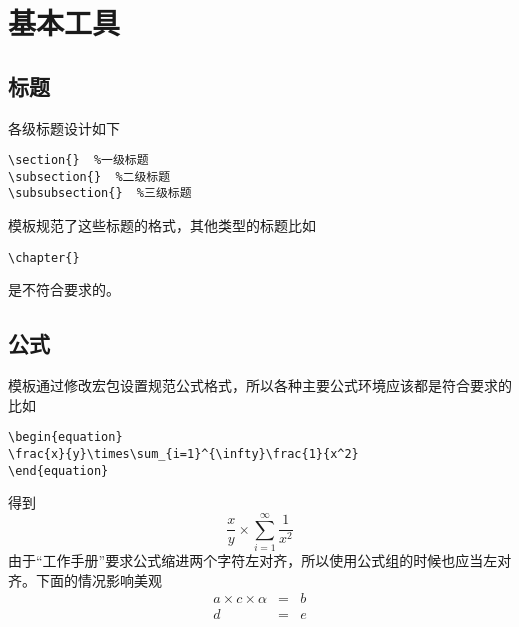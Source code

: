 \section{基本工具}
\label{ch2}
\subsection{标题}
\label{ch2_1}
各级标题设计如下
\begin{lstlisting}[frame=single]
\section{}  %一级标题
\subsection{}  %二级标题
\subsubsection{}  %三级标题
\end{lstlisting}
模板规范了这些标题的格式，其他类型的标题比如
\begin{lstlisting}[frame=single]
\chapter{}
\end{lstlisting}
是不符合要求的。\par

\subsection{公式}
\label{ch2_2}
模板通过修改宏包设置规范公式格式，所以各种主要公式环境应该都是符合要求的比如
\begin{lstlisting}[frame=single]
\begin{equation}
\frac{x}{y}\times\sum_{i=1}^{\infty}\frac{1}{x^2}
\end{equation}
\end{lstlisting}
得到
\begin{equation}
\frac{x}{y}\times\sum_{i=1}^{\infty}\frac{1}{x^2}
\end{equation}
由于“工作手册”要求公式缩进两个字符左对齐，所以使用公式组的时候也应当左对齐。下面的情况影响美观
\begin{equation}
\begin{array}{rcl}
a\times c\times \alpha&=&b\\
d&=&e
\end{array}
\end{equation}
\par

